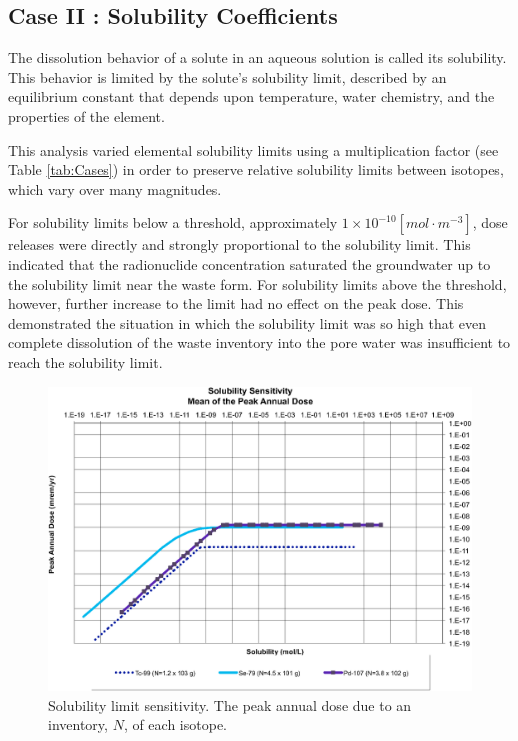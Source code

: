 
\subsection{Case II : Solubility Coefficients}

The dissolution behavior of a solute in an aqueous solution is called its 
solubility. This behavior is limited by the solute's solubility limit, described  
by an equilibrium constant that depends upon temperature, water chemistry, and 
the properties of the element. 

This analysis varied elemental solubility limits using a multiplication factor 
(see Table \ref{tab:Cases}) in order to preserve relative solubility limits 
between isotopes, which vary over many magnitudes.

For solubility limits below a threshold, approximately 
$1\times10^{-10}[mol\cdot m^{-3}]$, dose releases were directly 
and strongly proportional to the solubility limit. This indicated that the radionuclide 
concentration saturated the groundwater up to the solubility limit near the 
waste form.  For solubility limits above the threshold, however, further 
increase to the limit had no effect on the peak dose. This demonstrated the 
situation in which the solubility limit was so high that even complete 
dissolution of the waste inventory into the pore water was insufficient to reach 
the solubility limit.

\begin{figure}[ht]
  \centering
  \includegraphics[width=\linewidth]{Solubility_Summary.eps}
  \caption{Solubility limit sensitivity. The peak annual dose due to an 
  inventory, 
  $N$, of each isotope.}
  \label{fig:SolSum}
\end{figure}
